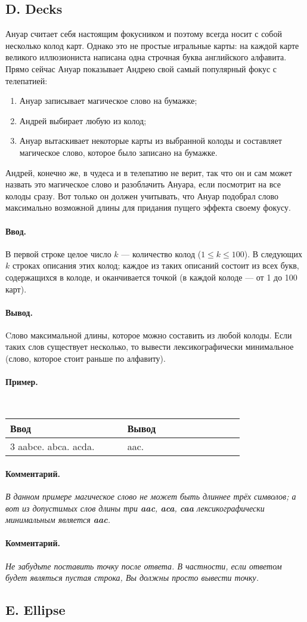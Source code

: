 \documentclass[12pt, a4paper]{article}
\newcommand{\informat}[1]
{
	\paragraph{Ввод.\\} #1
}
\newcommand{\outformat}[1]
{
	\paragraph{Вывод.\\} #1
}
\newcommand{\example}[2]
{
	\paragraph{Пример.\\}
	{\tt
	\begin{tabular}{|p{0.4\linewidth}|p{0.4\linewidth}|}
	\hline
	Ввод & Вывод \\
	\hline
	#1 & #2		\\
	\hline
	\end{tabular}
	}
}
\newcommand{\excomm}[1]
{
	\paragraph{Комментарий. \\}
	\textit{#1}
}
\begin{document}
\subsection*{D. Decks}

Ануар считает себя настоящим фокусником и поэтому всегда носит с собой несколько колод карт. Однако это не простые игральные карты: на каждой карте великого иллюзиониста написана одна строчная буква английского алфавита. Прямо сейчас Ануар показывает Андрею свой самый популярный фокус с телепатией:
\begin{enumerate}
\item Ануар записывает магическое слово на бумажке;
\item Андрей выбирает любую из колод;
\item Ануар вытаскивает некоторые карты из выбранной колоды и составляет магическое слово, которое было записано на бумажке. 
\end{enumerate}
Андрей, конечно же, в чудеса и в телепатию не верит, так что он и сам может назвать это магическое слово и разоблачить Ануара, если посмотрит на все колоды сразу. Вот только он должен учитывать, что Ануар подобрал слово максимально возможной длины для придания пущего эффекта своему фокусу.

\informat{В первой строке целое число $k$ --- количество колод ($1 \le k \le 100$). В следующих $k$ строках описания этих колод; каждое из таких описаний состоит из всех букв, содержащихся в колоде, и оканчивается точкой (в каждой колоде --- от 1 до 100 карт).}

\outformat{Cлово максимальной длины, которое можно составить из любой колоды. Если таких слов существует несколько, то вывести лексикографически минимальное (слово, которое стоит раньше по алфавиту).}

\example{3 \newline aabce. \newline abca. \newline acda.}{aac.}

\excomm{В данном примере магическое слово не может быть длиннее трёх символов; а вот из допустимых слов длины три \textbf{aac}, \textbf{aca}, \textbf{caa} лексикографически минимальным является \textbf{aac}.}

\excomm{Не забудьте поставить точку после ответа. В частности, если ответом будет являться пустая строка, Вы должны просто вывести точку.}



\subsection*{E. Ellipse}
\end{document}
